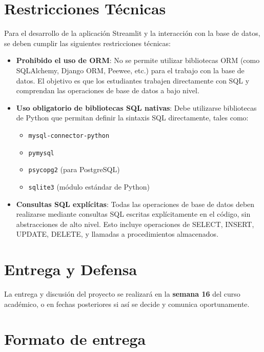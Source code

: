 \documentclass[10pt]{article}
\begin{document}
	\section*{Restricciones Técnicas}
	
	Para el desarrollo de la aplicación Streamlit y la interacción con la base de datos, se deben cumplir las siguientes restricciones técnicas:
	
	\begin{itemize}
		\item \textbf{Prohibido el uso de ORM}: No se permite utilizar bibliotecas ORM (como SQLAlchemy, Django ORM, Peewee, etc.) para el trabajo con la base de datos. El objetivo es que los estudiantes trabajen directamente con SQL y comprendan las operaciones de base de datos a bajo nivel.
		
		\item \textbf{Uso obligatorio de bibliotecas SQL nativas}: Debe utilizarse bibliotecas de Python que permitan definir la sintaxis SQL directamente, tales como:
		\begin{itemize}
			\item \texttt{mysql-connector-python}
			\item \texttt{pymysql}
			\item \texttt{psycopg2} (para PostgreSQL)
			\item \texttt{sqlite3} (módulo estándar de Python)
		\end{itemize}
		
		\item \textbf{Consultas SQL explícitas}: Todas las operaciones de base de datos deben realizarse mediante consultas SQL escritas explícitamente en el código, sin abstracciones de alto nivel. Esto incluye operaciones de SELECT, INSERT, UPDATE, DELETE, y llamadas a procedimientos almacenados.
		
	\end{itemize}
	
	\section*{Entrega y Defensa}
	
	La entrega y discusión del proyecto se realizará en la \textbf{semana 16} del curso académico, o en fechas posteriores si así se decide y comunica oportunamente.
	
	\section*{Formato de entrega}
	
\end{document}
